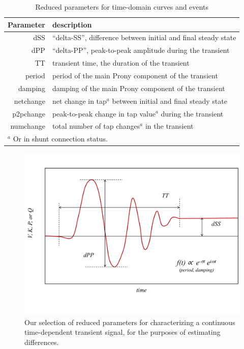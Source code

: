 \documentclass[conference]{IEEEtran}
\begin{document}
\begin{table}
  \caption{Reduced parameters for time-domain curves and events}
  \centering
  \begin{tabular}{@{}rl@{}}
    \toprule
    \textbf{Parameter} & \textbf{description}                                            \\
    \midrule
    dSS                & ``delta-SS'', difference between initial and final steady state \\
    dPP                & ``delta-PP'', peak-to-peak amplitude during the transient       \\
    TT                 & transient time, the duration of the transient                   \\
    period             & period of the main Prony component of the transient             \\
    damping            & damping of the main Prony component of the transient            \\
    netchange          & net change in tap$^a$ between initial and final steady state    \\
    p2pchange          & peak-to-peak change in tap value$^a$ during the transient       \\
    numchange          & total number of tap changes$^a$ in the transient                \\
    \bottomrule
    \multicolumn{2}{l}{$^a$ Or in shunt connection status.}
  \end{tabular}
  \label{tab:reducedparams}
\end{table}

\begin{figure}
  \centering
  \includegraphics[width=\columnwidth]{figs/transient_characteristics_1}
  \caption{Our selection of reduced parameters for characterizing a
    continuous time-dependent transient signal, for the purposes of
    estimating differences.}
  \label{fig:tcharacteristics1}
\end{figure}
\end{document}
